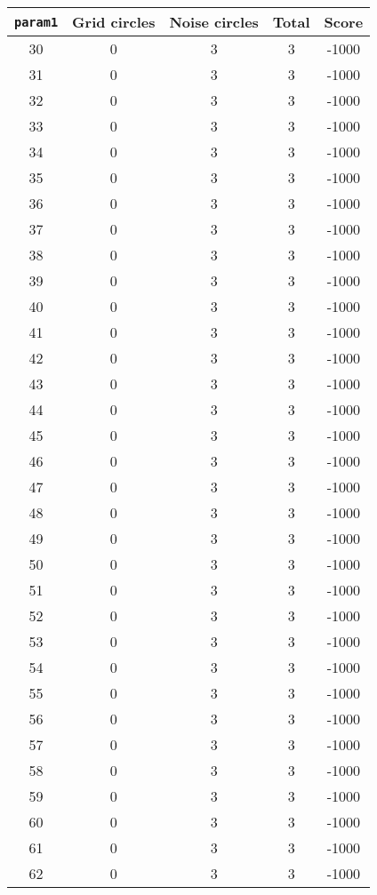 \documentclass[letterpaper, 12pt]{article}
\begin{document}
\begin{longtable}{|c|c|c|c|c|}
\hline
\textbf{\texttt{param1}} & \textbf{Grid circles} & \textbf{Noise circles} & \textbf{Total} & \textbf{Score} \\
\hline
30 & 0 & 3 & 3 & -1000 \\
\hline
31 & 0 & 3 & 3 & -1000 \\
\hline
32 & 0 & 3 & 3 & -1000 \\
\hline
33 & 0 & 3 & 3 & -1000 \\
\hline
34 & 0 & 3 & 3 & -1000 \\
\hline
35 & 0 & 3 & 3 & -1000 \\
\hline
36 & 0 & 3 & 3 & -1000 \\
\hline
37 & 0 & 3 & 3 & -1000 \\
\hline
38 & 0 & 3 & 3 & -1000 \\
\hline
39 & 0 & 3 & 3 & -1000 \\
\hline
40 & 0 & 3 & 3 & -1000 \\
\hline
41 & 0 & 3 & 3 & -1000 \\
\hline
42 & 0 & 3 & 3 & -1000 \\
\hline
43 & 0 & 3 & 3 & -1000 \\
\hline
44 & 0 & 3 & 3 & -1000 \\
\hline
45 & 0 & 3 & 3 & -1000 \\
\hline
46 & 0 & 3 & 3 & -1000 \\
\hline
47 & 0 & 3 & 3 & -1000 \\
\hline
48 & 0 & 3 & 3 & -1000 \\
\hline
49 & 0 & 3 & 3 & -1000 \\
\hline
50 & 0 & 3 & 3 & -1000 \\
\hline
51 & 0 & 3 & 3 & -1000 \\
\hline
52 & 0 & 3 & 3 & -1000 \\
\hline
53 & 0 & 3 & 3 & -1000 \\
\hline
54 & 0 & 3 & 3 & -1000 \\
\hline
55 & 0 & 3 & 3 & -1000 \\
\hline
56 & 0 & 3 & 3 & -1000 \\
\hline
57 & 0 & 3 & 3 & -1000 \\
\hline
58 & 0 & 3 & 3 & -1000 \\
\hline
59 & 0 & 3 & 3 & -1000 \\
\hline
60 & 0 & 3 & 3 & -1000 \\
\hline
61 & 0 & 3 & 3 & -1000 \\
\hline
62 & 0 & 3 & 3 & -1000 \\

\end{longtable}
\end{document}
